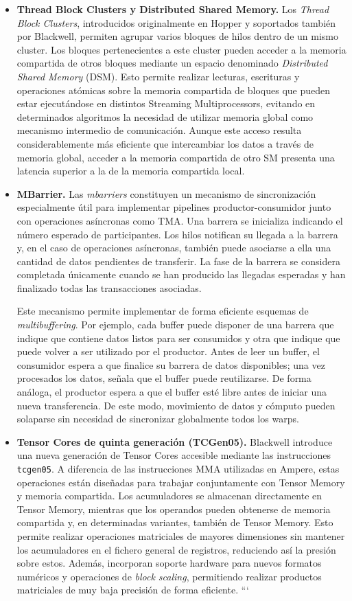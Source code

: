 \begin{itemize}
\item \textbf{Thread Block Clusters y Distributed Shared Memory.}
Los \textit{Thread Block Clusters}, introducidos originalmente en Hopper y soportados también por Blackwell, permiten agrupar varios bloques de hilos dentro de un mismo cluster. Los bloques pertenecientes a este cluster pueden acceder a la memoria compartida de otros bloques mediante un espacio denominado \textit{Distributed Shared Memory} (DSM). Esto permite realizar lecturas, escrituras y operaciones atómicas sobre la memoria compartida de bloques que pueden estar ejecutándose en distintos Streaming Multiprocessors, evitando en determinados algoritmos la necesidad de utilizar memoria global como mecanismo intermedio de comunicación. Aunque este acceso resulta considerablemente más eficiente que intercambiar los datos a través de memoria global, acceder a la memoria compartida de otro SM presenta una latencia superior a la de la memoria compartida local.

\item \textbf{MBarrier.}
Las \textit{mbarriers} constituyen un mecanismo de sincronización especialmente útil para implementar pipelines productor-consumidor junto con operaciones asíncronas como TMA. Una barrera se inicializa indicando el número esperado de participantes. Los hilos notifican su llegada a la barrera y, en el caso de operaciones asíncronas, también puede asociarse a ella una cantidad de datos pendientes de transferir. La fase de la barrera se considera completada únicamente cuando se han producido las llegadas esperadas y han finalizado todas las transacciones asociadas.

Este mecanismo permite implementar de forma eficiente esquemas de \textit{multibuffering}. Por ejemplo, cada buffer puede disponer de una barrera que indique que contiene datos listos para ser consumidos y otra que indique que puede volver a ser utilizado por el productor. Antes de leer un buffer, el consumidor espera a que finalice su barrera de datos disponibles; una vez procesados los datos, señala que el buffer puede reutilizarse. De forma análoga, el productor espera a que el buffer esté libre antes de iniciar una nueva transferencia. De este modo, movimiento de datos y cómputo pueden solaparse sin necesidad de sincronizar globalmente todos los warps.

\item \textbf{Tensor Cores de quinta generación (TCGen05).}
Blackwell introduce una nueva generación de Tensor Cores accesible mediante las instrucciones \texttt{tcgen05}. A diferencia de las instrucciones MMA utilizadas en Ampere, estas operaciones están diseñadas para trabajar conjuntamente con Tensor Memory y memoria compartida. Los acumuladores se almacenan directamente en Tensor Memory, mientras que los operandos pueden obtenerse de memoria compartida y, en determinadas variantes, también de Tensor Memory. Esto permite realizar operaciones matriciales de mayores dimensiones sin mantener los acumuladores en el fichero general de registros, reduciendo así la presión sobre estos. Además, incorporan soporte hardware para nuevos formatos numéricos y operaciones de \textit{block scaling}, permitiendo realizar productos matriciales de muy baja precisión de forma eficiente.
```


\end{itemize}
